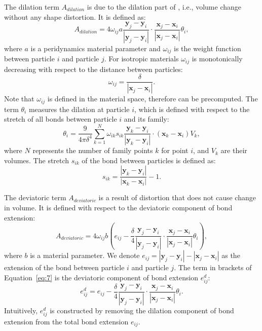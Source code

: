 The dilation term $A_{dilation}$ is due to the dilation part of , i.e., volume change without any shape distortion. It is defined as:
\begin{equation}
A_{dilation}=4\omega_{ij}a\frac{\mathbf{y}_j-\mathbf{y}_i}{|\mathbf{y}_j-\mathbf{y}_i|}\cdot\frac{\mathbf{x}_j-\mathbf{x}_i}{|\mathbf{x}_j-\mathbf{x}_i|}\theta_i,
\label{eq:3}
\end{equation}
where $a$ is a peridynamics material parameter and $\omega_{ij}$ is the weight function between particle $i$ and particle $j$. For isotropic materials $\omega_{ij}$ is monotonically decreasing with respect to the distance between particles:
\begin{equation}
\omega_{ij} = \frac{\delta}{|\mathbf{x}_j-\mathbf{x}_i|}.
\label{eq:4}
\end{equation}
Note that $\omega_{ij}$ is defined in the material space, therefore can be precomputed. The term $\theta_i$ measures the dilation at particle $i$, which is defined with respect to the stretch of all bonds between particle $i$ and its family:
\begin{equation}
\theta_i = \frac{9}{4\pi\delta^4}\sum_{k=1}^N\omega_{ik}s_{ik}\frac{\mathbf{y}_k-\mathbf{y}_i}{|\mathbf{y}_k-\mathbf{y}_i|}\cdot(\mathbf{x}_k-\mathbf{x}_i)V_k,
\label{eq:5}
\end{equation}
where $N$ represents the number of family points $k$ for point $i$, and $V_k$ are their volumes. The stretch $s_{ik}$ of the bond  between particles is defined as:
\begin{equation}
s_{ik}=\frac{|\mathbf{y}_k-\mathbf{y}_i|}{|\mathbf{x}_k-\mathbf{x}_i|} -1.
\label{eq:6}
\end{equation}

The deviatoric term $A_{deviatoric}$ is a result of distortion that does not cause change in volume. It is defined with respect to the deviatoric component of bond extension:
\begin{equation}
A_{deviatoric}=4\omega_{ij}b(e_{ij}-\frac{\delta}{4}\frac{\mathbf{y}_j-\mathbf{y}_i}{|\mathbf{y}_j-\mathbf{y}_i|}\cdot\frac{\mathbf{x}_j-\mathbf{x}_i}{|\mathbf{x}_j-\mathbf{x}_i|}\theta_i),
\label{eq:7}
\end{equation}
where $b$ is a material parameter. We denote $e_{ij} = |\mathbf{y}_j-\mathbf{y}_i|-|\mathbf{x}_j-\mathbf{x}_i|$ as the extension of the bond between particle $i$ and particle $j$. The term in brackets of Equation~\ref{eq:7} is the deviatoric component of bond extension $e_{ij}^d$:
\begin{equation}
e_{ij}^d = e_{ij}-\frac{\delta}{4}\frac{\mathbf{y}_j-\mathbf{y}_i}{|\mathbf{y}_j-\mathbf{y}_i|}\cdot\frac{\mathbf{x}_j-\mathbf{x}_i}{|\mathbf{x}_j-\mathbf{x}_i|}\theta_i.
\label{eq:8}
\end{equation}
Intuitively, $e_{ij}^d$ is constructed by removing the dilation component of bond extension from the total bond extension $e_{ij}$.

